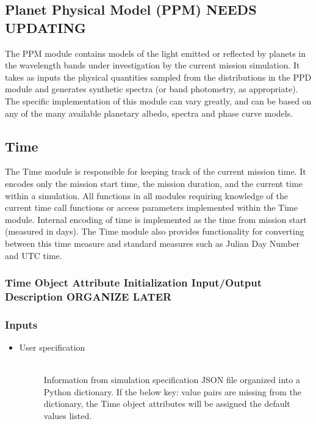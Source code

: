 \documentclass[cleanfoot]{asme2ej}
\begin{document}

\subsection{Planet Physical Model (PPM) NEEDS UPDATING}
The PPM module contains models of the light emitted or reflected by planets in the wavelength bands under investigation by the current mission simulation.  It takes as inputs the physical quantities sampled from the distributions in the PPD module and generates synthetic spectra (or band photometry, as appropriate).  The specific implementation of this module can vary greatly, and can be based on any of the many available planetary albedo, spectra and phase curve models.
\label{sec:planetphysicalmodel}


\subsection{Time} 
The Time module is responsible for keeping track of the current mission time.  It encodes only the mission start time, the mission duration, and the current time within a simulation.  All functions in all modules requiring knowledge of the current time call functions or access parameters implemented within the Time module.  Internal encoding of time is implemented as the time from mission start (measured in days).  The Time module also provides functionality for converting between this time measure and standard measures such as Julian Day Number and UTC time.
\label{sec:time}
\subsubsection{Time Object Attribute Initialization Input/Output Description ORGANIZE LATER}

\subsubsection*{Inputs}
\begin{itemize}
    \item
    \begin{description}
        \item[User specification] \hfill \\
        Information from simulation specification JSON file organized into a Python dictionary. If the below key: value pairs are missing from the dictionary, the Time object attributes will be assigned the default values listed.
    \end{description}
\end{itemize}
\end{document}
